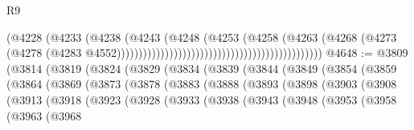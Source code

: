 \begin{lexlean}{R9}
\begin{coremodule}
                                                                          (@4228
                                                                            (@4233
                                                                              (@4238
                                                                                (@4243
                                                                                  (@4248
                                                                                    (@4253
                                                                                      (@4258
                                                                                        (@4263
                                                                                          (@4268
                                                                                            (@4273
                                                                                              (@4278
                                                                                                (@4283
                                                                                                  @4552)))))))))))))))))))))))))))))))))))))))))))))))
@4648 := @3809
    (@3814
      (@3819
        (@3824
          (@3829
            (@3834
              (@3839
                (@3844
                  (@3849
                    (@3854
                      (@3859
                        (@3864
                          (@3869
                            (@3873
                              (@3878
                                (@3883
                                  (@3888
                                    (@3893
                                      (@3898
                                        (@3903
                                          (@3908
                                            (@3913
                                              (@3918
                                                (@3923
                                                  (@3928
                                                    (@3933
                                                      (@3938
                                                        (@3943
                                                          (@3948
                                                            (@3953
                                                              (@3958
                                                                (@3963
                                                                  (@3968

\end{coremodule}
\end{lexlean}

